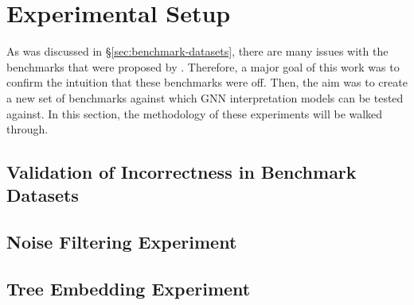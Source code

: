 \section{Experimental Setup}
As was discussed in \S\ref{sec:benchmark-datasets}, there are many issues with the benchmarks that were proposed by \cite{yuan_explainability_2021}. Therefore, a major goal of this work was to confirm the intuition that these benchmarks were off. Then, the aim was to create a new set of benchmarks against which GNN interpretation models can be tested against. In this section, the methodology of these experiments will be walked through.

\subsection{Validation of Incorrectness in Benchmark Datasets}

\subsection{Noise Filtering Experiment}

\subsection{Tree Embedding Experiment}